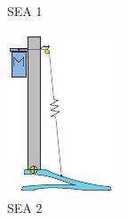 \begin{figure}[h]
\begin{subfigure}{.19\textwidth}
    \caption{SEA 1}
    \label{fig:series1}
  \end{subfigure}
  \begin{subfigure}{.2\textwidth}
    \centering
    \includegraphics[width=\linewidth]{figures/illustration_serial_pulley.pdf}
    \caption{SEA 2}
    \label{fig:series2}
  \end{subfigure}
  \begin{subfigure}{.19\textwidth}
    \centering

\end{subfigure}
\end{figure}
